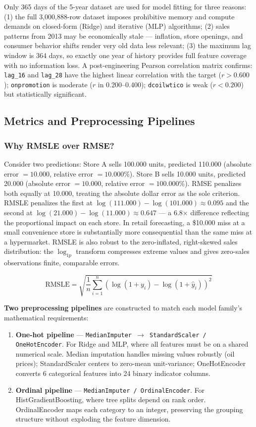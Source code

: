 Only 365 days of the 5-year dataset are used for model fitting for three reasons: (1) the full 3,000,888-row dataset imposes prohibitive memory and compute demands on closed-form (Ridge) and iterative (MLP) algorithms; (2) sales patterns from 2013 may be economically stale — inflation, store openings, and consumer behavior shifts render very old data less relevant; (3) the maximum lag window is 364 days, so exactly one year of history provides full feature coverage with no information loss. A post-engineering Pearson correlation matrix confirms: \texttt{lag\_16} and \texttt{lag\_28} have the highest linear correlation with the target ($r > 0.600$); \texttt{onpromotion} is moderate ($r$ in 0.200–0.400); \texttt{dcoilwtico} is weak ($r < 0.200$) but statistically significant.

\subsection{Metrics and Preprocessing Pipelines}

\subsubsection{Why RMSLE over RMSE?}
Consider two predictions: Store A sells 100.000 units, predicted 110.000 (absolute error $= 10.000$, relative error $= 10.000\%$). Store B sells 10.000 units, predicted 20.000 (absolute error $= 10.000$, relative error $= 100.000\%$). RMSE penalizes both equally at 10.000, treating the absolute dollar error as the sole criterion. RMSLE penalizes the first at $\log(111.000) - \log(101.000) \approx 0.095$ and the second at $\log(21.000) - \log(11.000) \approx 0.647$ — a 6.8$\times$ difference reflecting the proportional impact on each store. In retail forecasting, a \$10.000 miss at a small convenience store is substantially more consequential than the same miss at a hypermarket. RMSLE is also robust to the zero-inflated, right-skewed sales distribution: the $\log_{1p}$ transform compresses extreme values and gives zero-sales observations finite, comparable errors.

\[
\text{RMSLE} = \sqrt{\frac{1}{n}\sum_{i=1}^{n}\left(\log(1+y_i) - \log(1+\hat{y}_i)\right)^2}
\]

\textbf{Two preprocessing pipelines} are constructed to match each model family's mathematical requirements:

\begin{enumerate}
  \item \textbf{One-hot pipeline} — \texttt{MedianImputer $\rightarrow$ StandardScaler / OneHotEncoder}. For Ridge and MLP, where all features must be on a shared numerical scale. Median imputation handles missing values robustly (oil prices); StandardScaler centers to zero-mean unit-variance; OneHotEncoder converts 6 categorical features into 24 binary indicator columns.
  \item \textbf{Ordinal pipeline} — \texttt{MedianImputer / OrdinalEncoder}. For HistGradientBoosting, where tree splits depend on rank order. OrdinalEncoder maps each category to an integer, preserving the grouping structure without exploding the feature dimension.
\end{enumerate}

